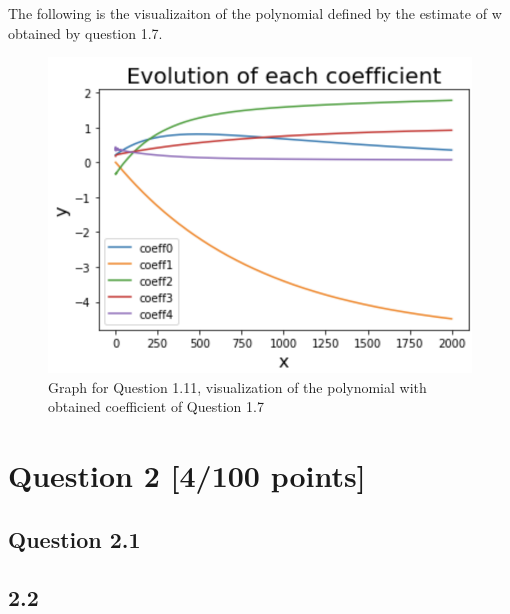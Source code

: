 \documentclass{article}
\begin{document}
The following is the visualizaiton of the polynomial defined by the estimate of w obtained by question 1.7.

\begin{figure}[!htb]
\centering
\includegraphics[scale = 0.8]{Question11_Graph.png}
\caption{\label{fig:fig}Graph for Question 1.11, visualization of the polynomial with obtained coefficient of Question 1.7}
\end{figure}

\newpage
\section{Question 2 [4/100 points]}

\subsection{Question 2.1}

\subsection{2.2}
\end{document}
